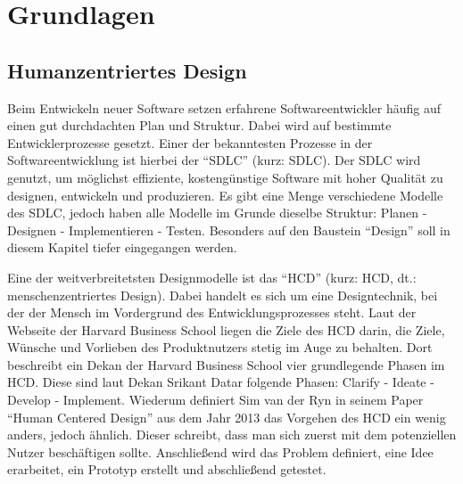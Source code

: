 
\chapter{Grundlagen}
\label{chapter:3}


\section{Humanzentriertes Design}

Beim Entwickeln neuer Software setzen erfahrene Softwareentwickler häufig auf einen gut durchdachten Plan und Struktur. Dabei wird auf bestimmte Entwicklerprozesse gesetzt. Einer der bekanntesten Prozesse in der Softwareentwicklung ist hierbei der “\acf{SDLC}” (kurz: \acs{SDLC}). Der \acs{SDLC} wird genutzt, um möglichst effiziente, kostengünstige Software mit hoher Qualität zu designen, entwickeln und produzieren.\cite{shylesh:2017} Es gibt eine Menge verschiedene Modelle des \acs{SDLC}, jedoch haben alle Modelle im Grunde dieselbe Struktur: Planen - Designen - Implementieren - Testen. Besonders auf den Baustein “Design” soll in diesem Kapitel tiefer eingegangen werden.

Eine der weitverbreitetsten Designmodelle ist das “\acf{HCD}” (kurz: \acs{HCD}, dt.: menschenzentriertes Design).  Dabei handelt es sich um eine Designtechnik, bei der der Mensch im Vordergrund des Entwicklungsprozesses steht.\cite{hbsc:2020} Laut der Webseite der Harvard Business School liegen die Ziele des \acs{HCD} darin, die Ziele, Wünsche und Vorlieben des Produktnutzers stetig im Auge zu behalten.\cite{hbsc:2020} Dort beschreibt ein Dekan der Harvard Business School vier grundlegende Phasen im \acs{HCD}. Diese sind laut Dekan Srikant Datar folgende Phasen: Clarify - Ideate - Develop - Implement.\cite{hbsc:2020} Wiederum definiert Sim van der Ryn in seinem Paper “Human Centered Design” aus dem Jahr 2013 das Vorgehen des \acs{HCD} ein wenig anders, jedoch ähnlich. Dieser schreibt, dass man sich zuerst mit dem potenziellen Nutzer beschäftigen sollte.\cite{vanderryn:2013} Anschließend wird das Problem definiert, eine Idee erarbeitet, ein Prototyp erstellt und abschließend getestet.\cite{vanderryn:2013}

